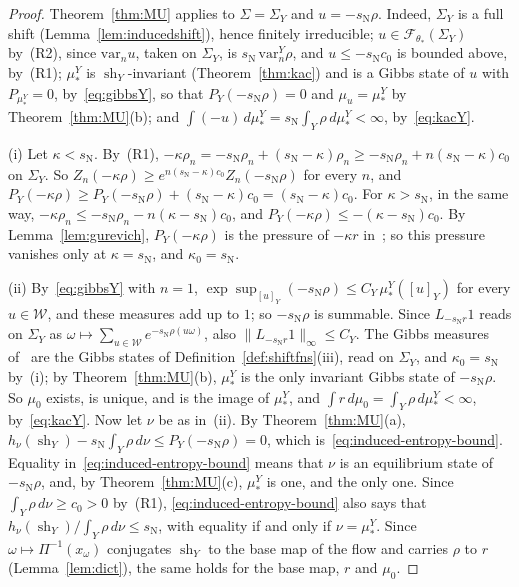 \documentclass[11pt]{amsart}
\theoremstyle{definition}
\theoremstyle{remark}
\newcommand{\cF}{\mathcal F}
\newcommand{\sN}{s_{\mathrm N}}
\newcommand{\norm}[1]{\lVert #1\rVert}
\begin{document}
\begin{proof}
Theorem~\ref{thm:MU} applies to $\Sigma=\Sigma_Y$ and $u=-\sN\rho$. Indeed, $\Sigma_Y$ is a full shift (Lemma~\ref{lem:inducedshift}), hence finitely irreducible; $u\in\cF_{\theta_*}(\Sigma_Y)$ by~(R2), since $\mathrm{var}_nu$, taken on $\Sigma_Y$, is $\sN\,\mathrm{var}^Y_n\rho$, and $u\le-\sN c_0$ is bounded above, by~(R1); $\mu_*^Y$ is $\operatorname{sh}_Y$-invariant (Theorem~\ref{thm:kac}) and is a Gibbs state of $u$ with $P_{\mu_*^Y}=0$, by~\eqref{eq:gibbsY}, so that $P_Y(-\sN\rho)=0$ and $\mu_u=\mu_*^Y$ by Theorem~\ref{thm:MU}(b); and $\int(-u)\,d\mu_*^Y=\sN\int_Y\rho\,d\mu_*^Y<\infty$, by~\eqref{eq:kacY}.

(i) Let $\kappa<\sN$. By~(R1), $-\kappa\rho_n=-\sN\rho_n+(\sN-\kappa)\rho_n\ge-\sN\rho_n+n(\sN-\kappa)c_0$ on $\Sigma_Y$. So $Z_n(-\kappa\rho)\ge e^{n(\sN-\kappa)c_0}Z_n(-\sN\rho)$ for every $n$, and $P_Y(-\kappa\rho)\ge P_Y(-\sN\rho)+(\sN-\kappa)c_0=(\sN-\kappa)c_0$. For $\kappa>\sN$, in the same way, $-\kappa\rho_n\le-\sN\rho_n-n(\kappa-\sN)c_0$, and $P_Y(-\kappa\rho)\le-(\kappa-\sN)c_0$. By Lemma~\ref{lem:gurevich}, $P_Y(-\kappa\rho)$ is the pressure of $-\kappa r$ in~\cite{AHSinv}; so this pressure vanishes only at $\kappa=\sN$, and $\kappa_0=\sN$.

(ii) By~\eqref{eq:gibbsY} with $n=1$, $\exp\sup_{[u]_Y}(-\sN\rho)\le C_Y\,\mu_*^Y([u]_Y)$ for every $u\in\mathcal W$, and these measures add up to $1$; so $-\sN\rho$ is summable. Since $L_{-\sN r}1$ reads on $\Sigma_Y$ as $\omega\mapsto\sum_{u\in\mathcal W}e^{-\sN\rho(u\omega)}$, also $\norm{L_{-\sN r}1}_\infty\le C_Y$. The Gibbs measures of~\cite{AHSinv} are the Gibbs states of Definition~\ref{def:shiftfns}(iii), read on $\Sigma_Y$, and $\kappa_0=\sN$ by~(i); by Theorem~\ref{thm:MU}(b), $\mu_*^Y$ is the only invariant Gibbs state of $-\sN\rho$. So $\mu_0$ exists, is unique, and is the image of $\mu_*^Y$, and $\int r\,d\mu_0=\int_Y\rho\,d\mu_*^Y<\infty$, by~\eqref{eq:kacY}. Now let $\nu$ be as in~(ii). By Theorem~\ref{thm:MU}(a), $h_\nu(\operatorname{sh}_Y)-\sN\int_Y\rho\,d\nu\le P_Y(-\sN\rho)=0$, which is~\eqref{eq:induced-entropy-bound}. Equality in~\eqref{eq:induced-entropy-bound} means that $\nu$ is an equilibrium state of $-\sN\rho$, and, by Theorem~\ref{thm:MU}(c), $\mu_*^Y$ is one, and the only one. Since $\int_Y\rho\,d\nu\ge c_0>0$ by~(R1), \eqref{eq:induced-entropy-bound} also says that $h_\nu(\operatorname{sh}_Y)/\int_Y\rho\,d\nu\le\sN$, with equality if and only if $\nu=\mu_*^Y$. Since $\omega\mapsto\Pi^{-1}(x_\omega)$ conjugates $\operatorname{sh}_Y$ to the base map of the flow and carries $\rho$ to $r$ (Lemma~\ref{lem:dict}), the same holds for the base map, $r$ and $\mu_0$.


\end{proof}
\end{document}
